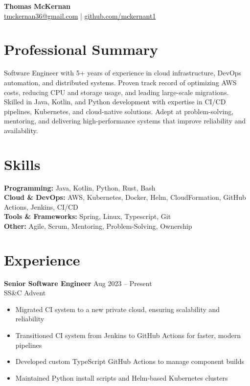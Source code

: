 \documentclass[11pt]{article}
\begin{document}
    \begin{center}
    {\LARGE \textbf{Thomas McKernan}}
        \\
        \vspace{2mm}
        \href{mailto:tmckernan36@gmail.com}{tmckernan36@gmail.com} \quad|\quad
        \href{https://github.com/mckernant1}{github.com/mckernant1}
    \end{center}



    \section*{Professional Summary}
    Software Engineer with 5+ years of experience in cloud infrastructure, DevOps automation, and distributed systems.
    Proven track record of optimizing AWS costs, reducing CPU and storage usage, and leading large-scale migrations.
    Skilled in Java, Kotlin, and Python development with expertise in CI/CD pipelines, Kubernetes, and cloud-native solutions.
    Adept at problem-solving, mentoring, and delivering high-performance systems that improve reliability and availability.


    \section*{Skills}
    \textbf{Programming:} Java, Kotlin, Python, Rust, Bash \\
    \textbf{Cloud \& DevOps:} AWS, Kubernetes, Docker, Helm, CloudFormation, GitHub Actions, Jenkins, CI/CD \\
    \textbf{Tools \& Frameworks:} Spring, Linux, Typescript, Git \\
    \textbf{Other:} Agile, Scrum, Mentoring, Problem-Solving, Ownership



    \section*{Experience}

    \noindent\textbf{Senior Software Engineer} \hfill Aug 2023 -- Present \\
    SS\&C Advent
    \begin{itemize}
        \item Migrated CI system to a new private cloud, ensuring scalability and reliability
        \item Transitioned CI system from Jenkins to GitHub Actions for faster, modern pipelines
        \item Developed custom TypeScript GitHub Actions to manage component builds
        \item Maintained Python install scripts and Helm-based Kubernetes clusters
    \end{itemize}
\end{document}
